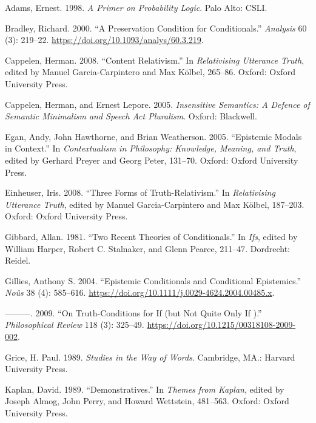 \documentclass[
  11pt,
  letterpaper,
  DIV=11,
  numbers=noendperiod,
  oneside]{scrartcl}
\newlength{\cslhangindent}
\newenvironment{CSLReferences}[2] %
 {\begin{list}{}{%
  \setlength{\itemindent}{0pt}
  \setlength{\leftmargin}{0pt}
  \setlength{\parsep}{0pt}
  \ifodd #1
   \setlength{\leftmargin}{\cslhangindent}
   \setlength{\itemindent}{-1\cslhangindent}
  \fi
  \setlength{\itemsep}{#2\baselineskip}}}
 {\end{list}}
\begin{document}
\label{refs}
\begin{CSLReferences}{1}{0}
Adams, Ernest. 1998. \emph{A Primer on Probability Logic}. Palo Alto:
CSLI.

Bradley, Richard. 2000. {``A Preservation Condition for Conditionals.''}
\emph{Analysis} 60 (3): 219--22.
\url{https://doi.org/10.1093/analys/60.3.219}.

Cappelen, Herman. 2008. {``Content Relativism.''} In \emph{Relativising
Utterance Truth}, edited by Manuel Garcia-Carpintero and Max Kölbel,
265--86. Oxford: Oxford University Press.

Cappelen, Herman, and Ernest Lepore. 2005. \emph{Insensitive Semantics:
A Defence of Semantic Minimalism and Speech Act Pluralism}. Oxford:
Blackwell.

Egan, Andy, John Hawthorne, and Brian Weatherson. 2005. {``{Epistemic
Modals in Context}.''} In \emph{Contextualism in Philosophy: Knowledge,
Meaning, and Truth}, edited by Gerhard Preyer and Georg Peter, 131--70.
Oxford: Oxford University Press.

Einheuser, Iris. 2008. {``Three Forms of Truth-Relativism.''} In
\emph{Relativising Utterance Truth}, edited by Manuel Garcia-Carpintero
and Max Kölbel, 187--203. Oxford: Oxford University Press.

Gibbard, Allan. 1981. {``Two Recent Theories of Conditionals.''} In
\emph{Ifs}, edited by William Harper, Robert C. Stalnaker, and Glenn
Pearce, 211--47. Dordrecht: Reidel.

Gillies, Anthony S. 2004. {``Epistemic Conditionals and Conditional
Epistemics.''} \emph{No{û}s} 38 (4): 585--616.
\url{https://doi.org/10.1111/j.0029-4624.2004.00485.x}.

---------. 2009. {``{On Truth-Conditions for If (but Not Quite Only If
)}.''} \emph{Philosophical Review} 118 (3): 325--49.
\url{https://doi.org/10.1215/00318108-2009-002}.

Grice, H. Paul. 1989. \emph{Studies in the Way of Words}. Cambridge,
MA.: Harvard University Press.

Kaplan, David. 1989. {``Demonstratives.''} In \emph{Themes from Kaplan},
edited by Joseph Almog, John Perry, and Howard Wettstein, 481--563.
Oxford: Oxford University Press.


\end{CSLReferences}
\end{document}
